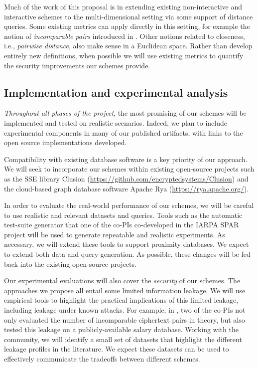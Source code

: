 Much of the work of this proposal is in extending existing
non-interactive and interactive schemes to the multi-dimensional setting
via some support of distance queries. Some existing metrics can apply
directly in this setting, for example the notion of \emph{incomparable
pairs} introduced in \cite{CCS:RACY16}. Other notions related to
closeness, i.e., \emph{pairwise distance}, also make sense in a
Euclidean space. Rather than develop entirely new definitions, when
possible we will use existing metrics to quantify the security
improvements our schemes provide.

\subsection{Implementation and experimental analysis}

\emph{Throughout all phases of the project}, the most promising of our
schemes will be implemented and tested on realistic scenarios.
Indeed, we plan to include
experimental components in many of our published artifacts, with
links to the open source implementations developed.

Compatibility with existing database software is a key priority of
our approach.  We will seek to incorporate our schemes within existing
open-source projects such as the SSE library Clusion
({\small \url{https://github.com/encryptedsystems/Clusion}}) and
the cloud-based graph database software
Apache Rya ({\small \url{https://rya.apache.org/}}).

In order to evaluate the real-world performance of our schemes, we will
be careful to use realistic and relevant datasets and queries. Tools
such as the automatic test-suite generator that one of the co-PIs co-developed
in the IARPA SPAR project \cite{HH14,varia2015automated} will be used to
generate repeatable and realistic experiments.  As necessary, we will extend
these tools to support proximity databases.  We expect to extend both data and
query generation.  As possible, these changes will be fed back into the
existing open-source projects.

Our experimental evaluations will also cover the \emph{security} of our
schemes. The approaches we propose all
entail some limited information leakage.
We will use empirical tools to highlight the practical
implications of this limited leakage, including leakage under known
attacks. For example, in \cite{CCS:RACY16}, two of the co-PIs not only
evaluated the number of incomparable ciphertext pairs in theory, but
also tested this leakage on a publicly-available salary database.  Working with the community, we will identify a small set of datasets that highlight the different leakage profiles in the literature.  We expect these datasets can be used to effectively communicate the tradeoffs between different schemes.
